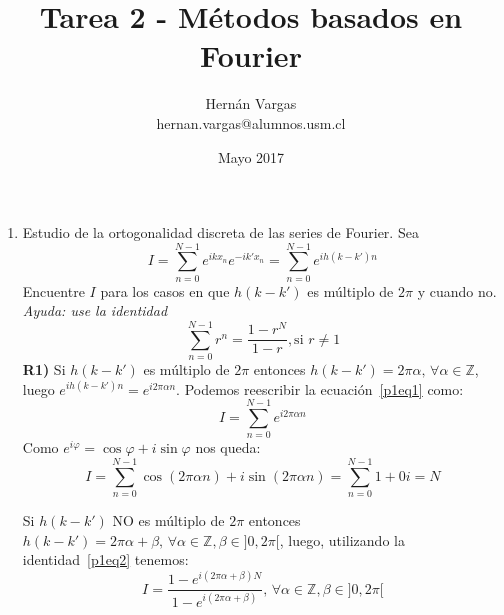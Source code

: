 \documentclass{article}
\title{Tarea 2 - Métodos basados en Fourier}
\author{Hernán Vargas \\ hernan.vargas@alumnos.usm.cl }
\date{Mayo 2017}
\begin{document}
\maketitle
\begin{enumerate}
    \item Estudio de la ortogonalidad discreta de las series de Fourier. Sea
    \begin{equation}\label{p1eq1}
        I = \sum_{n=0}^{N-1}e^{ikx_n}e^{-ik'x_n} = \sum_{n=0}^{N-1}e^{ih(k-k')n}
    \end{equation}
    Encuentre $I$ para los casos en que $h(k-k')$ es múltiplo de $2\pi$ y cuando no. \emph{Ayuda: use la identidad}
    \begin{equation}\label{p1eq2}
        \sum_{n=0}^{N-1}r^n = \frac{1-r^N}{1-r}, \text{si $r\neq 1$}
    \end{equation}
    \textbf{R1)} Si $h(k-k')$ es múltiplo de $2\pi$ entonces $h(k-k') = 2\pi\alpha, \, \forall \alpha \in \mathbb{Z}$, luego $ e^{ih(k-k')n} = e^{i2\pi\alpha n} $. Podemos reescribir la ecuación~\ref{p1eq1} como:
    $$ I = \sum_{n=0}^{N-1}e^{i2\pi\alpha n} $$
    Como $e^{i\varphi} = \cos{\varphi} + i\sin{\varphi}$ nos queda:
    $$
        I = \sum_{n=0}^{N-1}\cos(2\pi\alpha n) + i\sin(2\pi\alpha n)
          = \sum_{n=0}^{N-1}1 + 0i 
          = N
    $$
    
    Si $h(k-k')$ NO es múltiplo de $2\pi$ entonces $h(k-k') = 2\pi\alpha+\beta, \, \forall \alpha \in \mathbb{Z}, \beta \in ]0,2\pi[$, luego, utilizando la identidad~\ref{p1eq2} tenemos:
    $$ I = \frac{1-e^{i(2\pi\alpha + \beta)N}}{1-e^{i(2\pi\alpha+\beta)}}, \, \forall \alpha \in \mathbb{Z},\beta \in ]0,2\pi[ $$
    

\end{enumerate}
\end{document}
